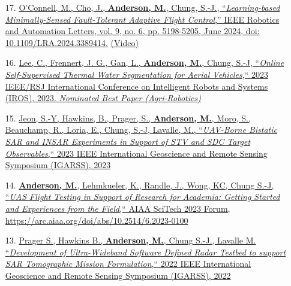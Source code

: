 \documentclass[12pt,letter,sans]{moderncv}        %
\begin{document}
\begin{itemize}
    \item [17.] \href{https://ieeexplore.ieee.org/document/10502204}
    {O’Connell, M., Cho, J., \underline{\textbf{Anderson, M.}}, Chung, S.-J., ``\textit{Learning-based Minimally-Sensed Fault-Tolerant Adaptive Flight Control},'' IEEE Robotics and Automation Letters, vol. 9, no. 6, pp. 5198-5205, June 2024, doi: 10.1109/LRA.2024.3389414.}
    \href{https://www.youtube.com/watch?v=IzFFEcvQiXw}{(Video)}
    
	\item[16.] \href{https://ieeexplore.ieee.org/document/10342016}
	{Lee, C., Frennert, J. G., Gan, L., \underline{\textbf{Anderson, M.}}, Chung, S.-J, ``\textit{Online Self-Supervised Thermal Water Segmentation for Aerial Vehicles},`` 2023 IEEE/RSJ International Conference on Intelligent Robots and Systems (IROS), 2023. \textit{Nominated Best Paper (Agri-Robotics)}}
	
	\item[15.] \href{https://ieeexplore.ieee.org/document/10282077}
	{Jeon, S.-Y, Hawkins, B., Prager, S., \underline{\textbf{Anderson, M.}}, Moro, S., Beauchamp, R., Loria, E., Chung, S.-J, Lavalle, M., ``\textit{UAV-Borne Bistatic SAR and INSAR Experiments in Support of STV and SDC Target Observables},`` 2023 IEEE International Geoscience and Remote Sensing Symposium (IGARSS), 2023}
	    
    \item [14.] \href{https://arc.aiaa.org/doi/10.2514/6.2023-0100}
    { \underline{\textbf{Anderson, M.}}, Lehmkueler, K., Randle, J., Wong, KC, Chung S.-J, ``\textit{UAS Flight Testing in Support of Research for Academia: Getting Started and Experiences from the Field},`` AIAA SciTech 2023 Forum, \url{https://arc.aiaa.org/doi/abs/10.2514/6.2023-0100}}
    
    \item [13.] \href{https://ieeexplore.ieee.org/document/9883873}
    {Prager S., Hawkins B., \underline{\textbf{Anderson, M.}}, Chung S.-J., Lavalle M. ``\textit{Development of Ultra-Wideband Software Defined Radar Testbed to support SAR Tomographic Mission Formulation},`` 2022 IEEE International Geoscience and Remote Sensing Symposium (IGARSS), 2022}
    

\end{itemize}
\end{document}

